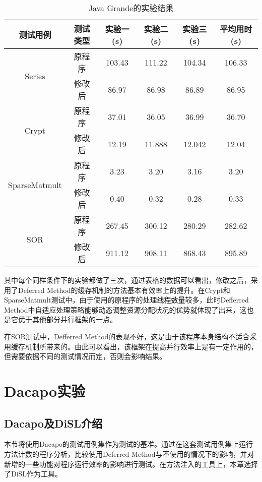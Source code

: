 \begin{table}[htbp]
	\centering
	\caption{\label{table1}Java Grande的实验结果}
	\begin{tabular}{c|c|c|c|c|c}
		\hline
		测试用例 & 测试类型 & 实验一(s) & 实验二(s) & 实验三(s) & 平均用时(s) \\
		\hline
		\multirow{2}{*}{Series} & 原程序 & 103.43 & 111.22 & 104.34 & 106.33 \\
		\cline{2-6}
		& 修改后 & 86.97 & 86.98 & 86.89 &86.95 \\
		\hline
		\multirow{2}{*}{Crypt} & 原程序 & 37.01 & 36.05 & 36.99 & 36.70 \\
		\cline{2-6}
		& 修改后 & 12.19 & 11.888 & 12.042 &12.04 \\
		\hline
		\multirow{2}{*}{SparseMatmult} & 原程序 & 3.23 & 3.20 & 3.16 & 3.20 \\
		\cline{2-6}
		& 修改后 & 0.40 & 0.32 & 0.28 & 0.33 \\
		\hline
		\multirow{2}{*}{SOR} & 原程序 & 267.45 & 300.12 & 280.29 & 282.62 \\
		\cline{2-6}
		& 修改后 & 911.12 & 908.11 & 868.43 & 895.89 \\
		\hline
	\end{tabular}
\end{table}

其中每个同样条件下的实验都做了三次，通过表格的数据可以看出，修改之后，采用了Deferred Method的缓存机制的方法基本有效率上的提升。在Crypt和SparseMatmult测试中，由于使用的原程序的处理线程数量较多，此时Defferred Method中自适应处理策略能够动态调整资源分配状况的优势就体现了出来，这也是它优于其他部分并行框架的一点。

在SOR测试中，Defferred Method的表现不好，这是由于该程序本身结构不适合采用缓存机制所带来的。由此可以看出，该框架在提高并行效率上是有一定作用的，但需要依据不同的测试情况而定，否则会影响结果。

\section{Dacapo实验}

\subsection{Dacapo及DiSL介绍}

本节将使用Dacapo的测试用例集作为测试的基准。通过在这套测试用例集上运行方法计数的程序分析，比较使用Deferred Method与不使用的情况下的影响，并对新增的一些功能对程序运行效率的影响进行测试。在方法注入的工具上，本章选择了DiSL作为工具。

